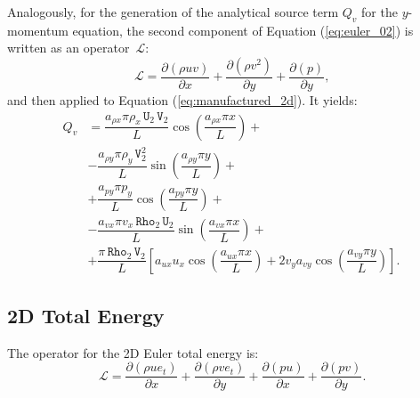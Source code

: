 \documentclass[10pt]{article}
\newcommand{\Diff}[2] {\dfrac{\partial( #1)}{\partial #2}}
\newcommand{\Rho}{\,\mathtt{Rho}}
\newcommand{\U}{\,\mathtt{U}}
\newcommand{\V}{\,\mathtt{V}}
\newcommand{\Lo}{\,\mathcal{L}}
\begin{document}
Analogously, for the generation of the analytical source term $Q_v$ for the $y$-momentum equation, the second component of Equation  (\ref{eq:euler_02})  is written as an  operator $\Lo$:
\begin{equation*}
   \Lo =\Diff{\rho u v}{x} + \Diff{\rho  v^2 }{y}+ \Diff{p}{y},
\end{equation*}
and then applied to Equation  (\ref{eq:manufactured_2d}). It yields:
\begin{equation}
 \begin{split}
Q_v &=\dfrac{ a_{\rho x} \pi \rho_x \U_2 \V_2 }{L}\cos\left(\dfrac{a_{\rho x} \pi x}{L}\right)+\\
&-\dfrac{a_{\rho y} \pi \rho_y \V_2^2 }{L}\sin\left(\dfrac{a_{\rho y} \pi y}{L}\right)+\\
&+\dfrac{a_{py} \pi p_y}{L}\cos\left(\dfrac{a_{py} \pi y}{L}\right) +\\
&-\dfrac{ a_{vx} \pi v_x \Rho_2 \U_2}{L}\sin\left(\dfrac{a_{vx} \pi x}{L}\right)+\\
&+\dfrac{\pi \Rho_2 \V_2}{L}\left[a_{ux} u_x \cos\left(\dfrac{a_{ux} \pi x}{L}\right)+2 v_y a_{vy} \cos\left(\dfrac{a_{vy} \pi y}{L}\right)\right].
 \end{split}
\end{equation}



\subsection{2D Total Energy}

The operator for the 2D Euler total energy is:
\begin{equation*}
 \Lo=  \Diff{\rho ue_t }{x}+\Diff{\rho ve_t}{y}+\Diff{pu}{x} +\Diff{pv}{y}.
\end{equation*}
\end{document}

